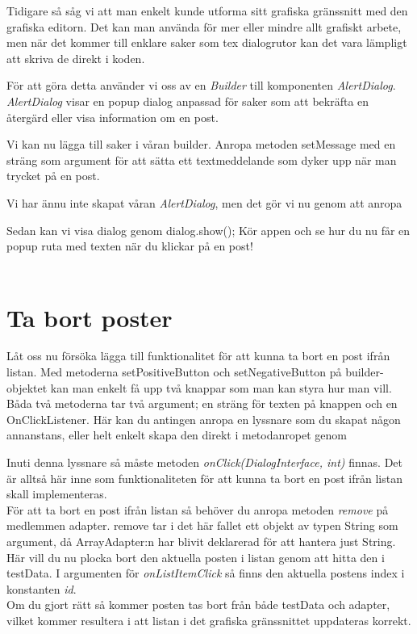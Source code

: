 \documentclass[11 pt, titlepage]{article} %
\begin{document}
Tidigare så såg vi att man enkelt kunde utforma sitt grafiska gränssnitt med den grafiska editorn. Det kan man använda för mer eller mindre allt grafiskt arbete, men när det kommer till enklare saker som tex dialogrutor kan det vara lämpligt att skriva de direkt i koden.

För att göra detta använder vi oss av en \textit{Builder} till komponenten \textit{AlertDialog}. \textit{AlertDialog} visar en popup dialog anpassad för saker som att bekräfta en återgärd eller visa information om en post.


Vi kan nu lägga till saker i våran builder. Anropa metoden setMessage med en sträng som argument för att sätta ett textmeddelande som dyker upp när man trycket på en post.

Vi har ännu inte skapat våran \textit{AlertDialog}, men det gör vi nu genom att anropa 

Sedan kan vi visa dialog genom dialog.show();
Kör appen och se hur du nu får en popup ruta med texten när du klickar på en post!\\ \\

\section{Ta bort poster}
Låt oss nu försöka lägga till funktionalitet för att kunna ta bort en post ifrån listan. 
Med metoderna setPositiveButton och setNegativeButton på builder-objektet kan man enkelt få upp två knappar som man kan styra hur man vill. Båda två metoderna tar två argument; en sträng för texten på knappen och en OnClickListener.
Här kan du antingen anropa en lyssnare som du skapat någon annanstans, eller helt enkelt skapa den direkt i metodanropet genom 


Inuti denna lyssnare så måste metoden \textit{onClick(DialogInterface, int)} finnas. Det är alltså här inne som funktionaliteten för att kunna ta bort en post ifrån listan skall implementeras.\\

För att ta bort en post ifrån listan så behöver du anropa metoden \textit{remove} på medlemmen adapter. remove tar i det här fallet ett objekt av typen String som argument, då ArrayAdapter:n har blivit deklarerad för att hantera just String. Här vill du nu plocka bort den aktuella posten i listan genom att hitta den i testData.
I argumenten för \textit{onListItemClick} så finns den aktuella postens index i konstanten \textit{id}.\\  
Om du gjort rätt så kommer posten tas bort från både testData och adapter, vilket kommer resultera i att listan i det grafiska gränssnittet uppdateras korrekt.\\
\end{document}

